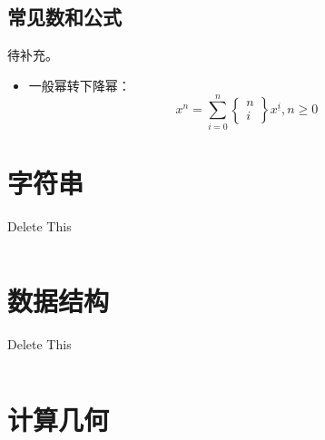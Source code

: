 \documentclass[twoside]{article}
\begin{document}
\subsection{常见数和公式}
待补充。

\begin{itemize}
    \item 一般幂转下降幂： $$x^n=\sum\limits_{i=0}^n\begin{Bmatrix}n\\i\end{Bmatrix}x^{\underline{i}},n\geq 0$$
\end{itemize}\clearpage\section{字符串}
Delete This
\begin{lstlisting}
\end{lstlisting}
\clearpage\section{数据结构}
Delete This
\begin{lstlisting}
\end{lstlisting}
\clearpage\section{计算几何}
\end{document}
